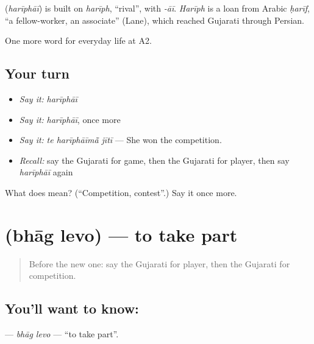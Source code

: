 \begin{cousinweb}
\textbf{} (\emph{harīphāī}) is built on \emph{harīph}, \textquotedblleft{}rival\textquotedblright{}, with \emph{-āī}. \emph{Harīph} is a loan from Arabic \emph{ḥarīf}, \textquotedblleft{}a fellow-worker, an associate\textquotedblright{} (Lane), which reached Gujarati through Persian.
\end{cousinweb}

\begin{grammarlens}[title={What you've built}]
One more word for everyday life at A2.
\end{grammarlens}

\subsection*{Your turn}
\begin{itemize}
\raggedright
  \item \emph{Say it:} \emph{harīphāī}
  \item \emph{Say it:} \emph{harīphāī}, once more
  \item \emph{Say it:} \emph{te harīphāīmā̃ jītī} — She won the competition.
  \item \emph{Recall:} say the Gujarati for game, then the Gujarati for player, then say \emph{harīphāī} again
\end{itemize}

\begin{tcolorbox}[breakable,colback=teal!4,colframe=teal!35!black,title={Before you move on}]
What does  mean? (\textquotedblleft{}Competition, contest\textquotedblright{}.) Say it once more.
\end{tcolorbox}
\section[\texorpdfstring{\gu{ભાગ} \gu{લેવો} (bhāg levo)}{ભાગ લેવો (bhāg levo)}]{  (bhāg levo) — to take part}

\label{lesson:GU-C257-bhag-levo}



\begin{quote}
Before the new one: say the Gujarati for player, then the Gujarati for competition.
\end{quote}

\subsection*{You'll want to know:  }
\textbf{ } — \emph{bhāg levo} — \textquotedblleft{}to take part\textquotedblright{}.

